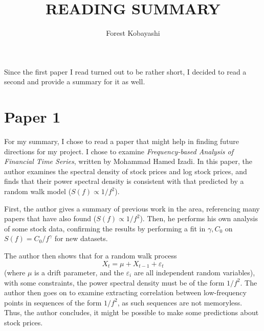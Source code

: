 \documentclass[scipaper, 189]{pset}
\title{READING SUMMARY}
\author{Forest Kobayashi}
\affiliation{Department of Mathematics, Harvey Mudd College,
  Claremont, CA 91711}
\begin{document}
\begin{multicols}{2}
  \large
  Since the first paper I read turned out to be rather short, I decided
  to read a second and provide a summary for it as well.
  \section{Paper 1}
  For my summary, I chose to read a paper that might help in finding
  future directions for my project. I chose to examine
  \textit{Frequency-based Analysis of Financial Time Series}, written
  by Mohammad Hamed Izadi. In this paper, the author examines the
  spectral density of stock prices and log stock prices, and finds
  that their power spectral density is consistent with that predicted
  by a random walk model ($S(f) \propto 1/f^2$).

  First, the author gives a summary of previous work in the area,
  referencing many papers that have also found ($S(f) \propto 1/f^2$).
  Then, he performs his own analysis of some stock data, confirming
  the results by performing a fit in $\gamma, C_0$ on $S(f) = C_0 /
  f^\gamma$ for new datasets.

  The author then shows that for a random walk process
  \[
    X_t = \mu + X_{t-1} + \varepsilon_t
  \]
  (where $\mu$ is a drift parameter, and the $\varepsilon_i$ are all
  independent random variables), with some constraints, the power
  spectral density must be of the form $1/f^2$. The author then goes
  on to examine extracting correlation between low-frequency points in
  sequences of the form $1/f^2$, as such sequences are not memoryless.
  Thus, the author concludes, it might be possible to make some
  predictions about stock prices.

\end{multicols}
\end{document}
